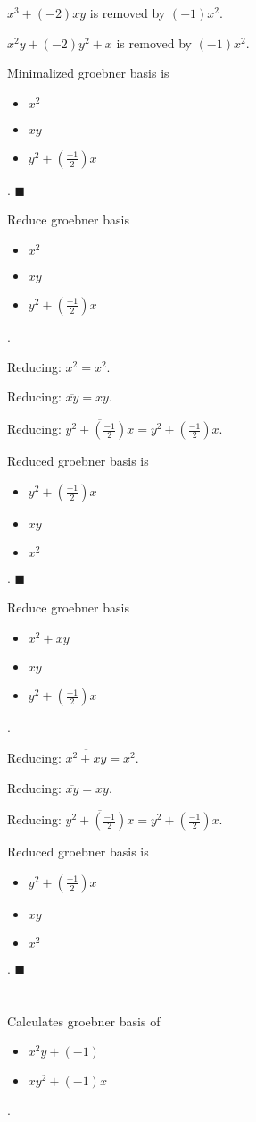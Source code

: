 \documentclass{jsarticle}
\begin{document}
$x^{3}+(-2)xy$ is removed by $(-1)x^{2}$.  

$x^{2}y+(-2)y^{2}+x$ is removed by $(-1)x^{2}$.  

Minimalized groebner basis is 
\begin{itemize}
\item $x^{2}$
\item $xy$
\item $y^{2}+(\frac{-1}{2})x$
\end{itemize}  . 
$\blacksquare{}$

Reduce groebner basis 
\begin{itemize}
\item $x^{2}$
\item $xy$
\item $y^{2}+(\frac{-1}{2})x$
\end{itemize}  . 


Reducing: $\overline{x^{2}} = x^{2}$.  

Reducing: $\overline{xy} = xy$.  

Reducing: $\overline{y^{2}+(\frac{-1}{2})x} = y^{2}+(\frac{-1}{2})x$.  

Reduced groebner basis is 
\begin{itemize}
\item $y^{2}+(\frac{-1}{2})x$
\item $xy$
\item $x^{2}$
\end{itemize}  . 
$\blacksquare{}$

Reduce groebner basis 
\begin{itemize}
\item $x^{2}+xy$
\item $xy$
\item $y^{2}+(\frac{-1}{2})x$
\end{itemize}  . 


Reducing: $\overline{x^{2}+xy} = x^{2}$.  

Reducing: $\overline{xy} = xy$.  

Reducing: $\overline{y^{2}+(\frac{-1}{2})x} = y^{2}+(\frac{-1}{2})x$.  

Reduced groebner basis is 
\begin{itemize}
\item $y^{2}+(\frac{-1}{2})x$
\item $xy$
\item $x^{2}$
\end{itemize}  . 
$\blacksquare{}$

\section{}Calculates groebner basis of 
\begin{itemize}
\item $x^{2}y+(-1)$
\item $xy^{2}+(-1)x$
\end{itemize}  . 
\end{document}
